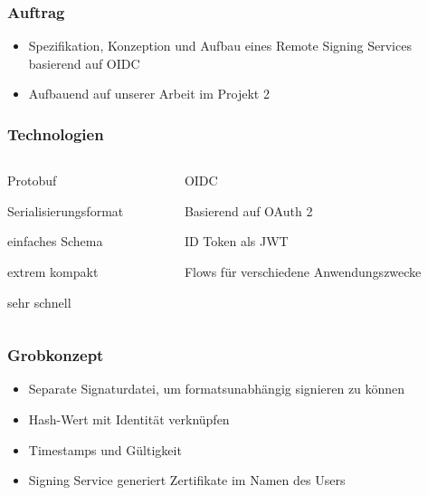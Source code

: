\documentclass[12pt,xcolor=pdftex,dvipsnames,table]{beamer}
\newcommand{\Subitem}[1]{
{\setlength\itemindent{15pt} \item[-] #1}
}
\begin{document}
\begin{frame}
\begin{columns}[T]
\begin{column}{0.5\textwidth}
            \end{column}
        \end{columns}
    \end{frame}

    \begin{frame}
        \frametitle{Auftrag}
        \begin{itemize}
            \item Spezifikation, Konzeption und Aufbau eines Remote Signing Services basierend auf OIDC
            \item Aufbauend auf unserer Arbeit im Projekt 2
        \end{itemize}
    \end{frame}

    \begin{frame}
        \frametitle{Technologien}
        \begin{columns}[T]
            \begin{column}{0.5\textwidth}
                \begin{itemize}
                    \item Protobuf
                    \Subitem{Serialisierungsformat}
                    \Subitem{einfaches Schema}
                    \Subitem{extrem kompakt}
                    \Subitem{sehr schnell}
                \end{itemize}
            \end{column}
            \begin{column}{0.5\textwidth}
                \begin{itemize}
                    \item OIDC
                    \Subitem{Basierend auf OAuth 2}
                    \Subitem{ID Token als JWT}
                    \Subitem{Flows für verschiedene Anwendungszwecke}
                \end{itemize}
            \end{column}
        \end{columns}
    \end{frame}

    \begin{frame}
        \frametitle{Grobkonzept}
        \begin{itemize}
            \item Separate Signaturdatei, um formatsunabhängig signieren zu können
            \item Hash-Wert mit Identität verknüpfen
            \item Timestamps und Gültigkeit
            \item Signing Service generiert Zertifikate im Namen des Users
        \end{itemize}
    \end{frame}
\end{document}
